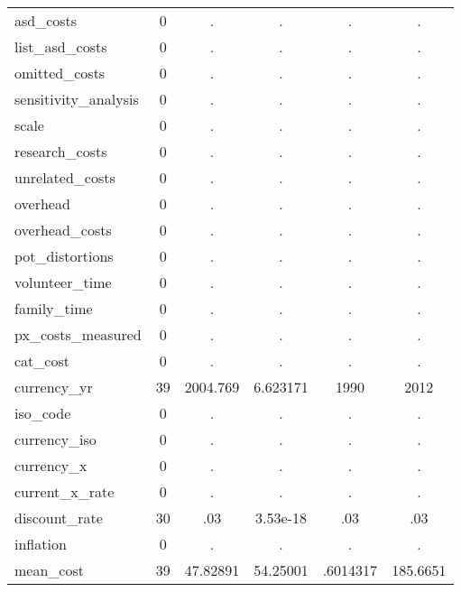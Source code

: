 \begin{table}[htbp]
\begin{tabular}{l*{1}{ccccc}}
asd\_costs   &           0&           .&           .&           .&           .\\
list\_asd\_costs&           0&           .&           .&           .&           .\\
omitted\_costs&           0&           .&           .&           .&           .\\
sensitivity\_analysis&           0&           .&           .&           .&           .\\
scale       &           0&           .&           .&           .&           .\\
research\_costs&           0&           .&           .&           .&           .\\
unrelated\_costs&           0&           .&           .&           .&           .\\
overhead    &           0&           .&           .&           .&           .\\
overhead\_costs&           0&           .&           .&           .&           .\\
pot\_distortions&           0&           .&           .&           .&           .\\
volunteer\_time&           0&           .&           .&           .&           .\\
family\_time &           0&           .&           .&           .&           .\\
px\_costs\_measured&           0&           .&           .&           .&           .\\
cat\_cost    &           0&           .&           .&           .&           .\\
currency\_yr &          39&    2004.769&    6.623171&        1990&        2012\\
iso\_code    &           0&           .&           .&           .&           .\\
currency\_iso&           0&           .&           .&           .&           .\\
currency\_x  &           0&           .&           .&           .&           .\\
current\_x\_rate&           0&           .&           .&           .&           .\\
discount\_rate&          30&         .03&    3.53e-18&         .03&         .03\\
inflation   &           0&           .&           .&           .&           .\\
mean\_cost   &          39&    47.82891&    54.25001&    .6014317&    185.6651\\

\end{tabular}
\end{table}
